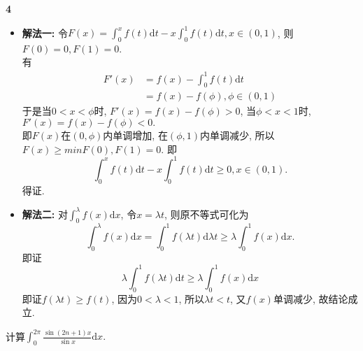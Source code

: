 \documentclass[12pt]{article}
\newenvironment{solution}[2][Solution]{\begin{trivlist}
\item[\hskip \labelsep {\bfseries #1}]}{\end{trivlist}}
\newenvironment{problem}[2][Problem]{\begin{trivlist}
\item[\hskip \labelsep {\bfseries #1}\hskip \labelsep {\bfseries #2.}]}{\end{trivlist}}
\begin{document}
\begin{solution}{4} \textbf{4}

    \begin{itemize}
        \item \textbf{解法一:} 令$F(x)=\int_0^x f(t)\mathrm{d}t - x\int_0^1 f(t)\mathrm{d}t, x\in \left(0, 1\right)$, 则$F(0)=0, F(1)=0$.\\
        有
        \[
            \begin{aligned}
                F'(x) &= f(x) - \int_0^1 f(t)\mathrm{d}t \\
                &= f(x) - f(\phi), \phi \in \left(0, 1\right)
            \end{aligned}    
        \]
        于是当$0<x<\phi$时, $F'(x) = f(x)-f(\phi) > 0$, 当$\phi<x<1$时, $F'(x) = f(x)-f(\phi) < 0.$\\
        即$F(x)$在$\left(0, \phi\right)$内单调增加, 在$\left(\phi, 1\right)$内单调减少, 所以$F(x)\geq min{F(0), F(1)} = 0$. 即
        \[
            \int_0^x f(t)\mathrm{d}t - x\int_0^1 f(t)\mathrm{d}t \geq 0, x\in \left(0, 1\right).    
        \]
        得证.
        
        \item \textbf{解法二:} 对$\int_0^{\lambda} f(x)\mathrm{d}x$, 令$x = \lambda t$, 则原不等式可化为
        \[
            \int_0^{\lambda} f(x)\mathrm{d}x = \int_0^1 f(\lambda t)\mathrm{d}\lambda t \geq \lambda \int_0^1 f(x)\mathrm{d}x.
        \]
        即证
        \[
            \lambda \int_0^1 f(\lambda t)\mathrm{d}t \geq \lambda \int_0^1 f(x)\mathrm{d}x    
        \]
        即证$f(\lambda t) \geq f(t)$, 因为$0<\lambda<1$, 所以$\lambda t < t$, 又$f(x)$单调减少, 故结论成立.
    \end{itemize}    
\end{solution}


\begin{problem}{5}
    计算$\int_0^{2\pi} \frac{\sin(2n+1)x}{\sin x}\mathrm{d}x .$
\end{problem}
\end{document}
